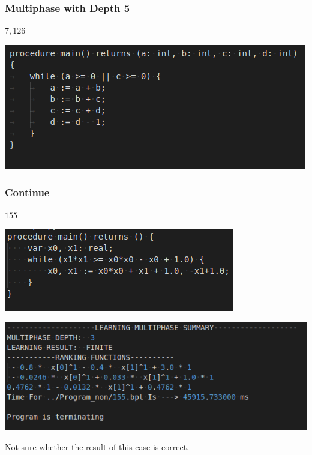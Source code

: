 \documentclass[10pt]{beamer}
\begin{document}
\begin{frame}\frametitle{Multiphase with Depth 5}
$7,126$

\begin{center}
\includegraphics[scale=0.5]{7.png}
\end{center}

\end{frame}
\begin{frame}\frametitle{Continue}
$155$
\begin{center}
\includegraphics[scale=0.5]{155.png}

\includegraphics[scale=0.5]{155Result.png}
\end{center}
Not sure whether the result of this case is correct.

\end{frame}
\end{document}
